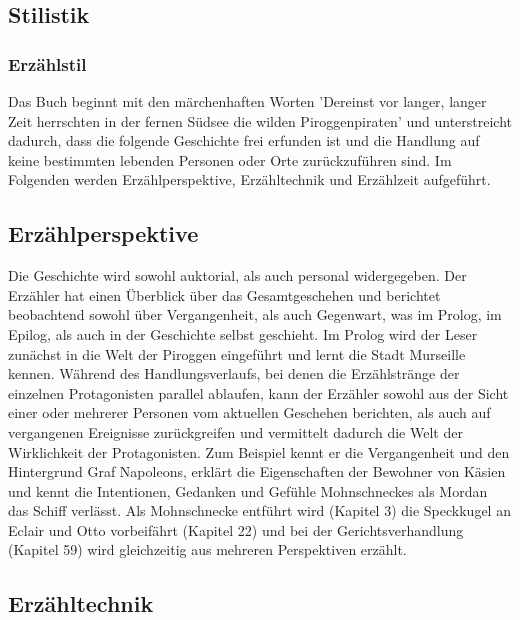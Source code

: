 \subsection{Stilistik}

\subsubsection{Erzählstil}


Das Buch beginnt mit den märchenhaften Worten 'Dereinst vor langer, langer Zeit herrschten in der fernen Südsee die wilden Piroggenpiraten'\cite[S.7]{pir} und unterstreicht dadurch, dass die folgende Geschichte frei erfunden ist und die Handlung auf keine bestimmten lebenden Personen oder Orte zurückzuführen sind. 
Im Folgenden werden Erzählperspektive, Erzähltechnik und Erzählzeit aufgeführt.

\subsection{Erzählperspektive}

Die Geschichte wird sowohl auktorial, als auch personal widergegeben. Der Erzähler hat einen Überblick über das Gesamtgeschehen und berichtet  beobachtend sowohl über Vergangenheit, als auch Gegenwart, was im Prolog, im Epilog, als auch in der Geschichte selbst geschieht. 
Im Prolog wird der Leser zunächst in die Welt der Piroggen eingeführt und lernt die Stadt Murseille kennen. Während des Handlungsverlaufs, bei denen die Erzählstränge der einzelnen Protagonisten parallel ablaufen, kann der Erzähler sowohl aus der Sicht einer oder mehrerer Personen vom aktuellen Geschehen berichten, als auch auf vergangenen Ereignisse zurückgreifen und vermittelt dadurch die Welt der Wirklichkeit der Protagonisten. Zum Beispiel kennt er die Vergangenheit und den Hintergrund Graf Napoleons, \cite[S.17f]{pir} erklärt die Eigenschaften der Bewohner von Käsien \cite[S.140f]{pir} und kennt die Intentionen, Gedanken und Gefühle Mohnschneckes als Mordan das Schiff verlässt.\cite[S.374]{pir} Als Mohnschnecke entführt wird (Kapitel 3) die Speckkugel an Eclair und Otto vorbeifährt (Kapitel 22) und bei der Gerichtsverhandlung (Kapitel 59) wird gleichzeitig aus mehreren Perspektiven erzählt.



\subsection{Erzähltechnik}

